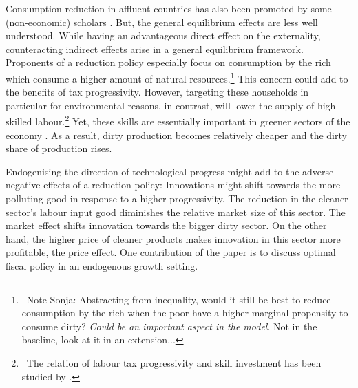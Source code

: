 
 Consumption reduction in affluent countries has also been promoted by some (non-economic) scholars \citep{Schor2005SustainableReduction, Pullinger2014WorkingDesign, Arrow2004AreMuch}. But, the general equilibrium effects are less well understood.
While having an advantageous direct effect on the externality, counteracting indirect effects arise in a general equilibrium framework. Proponents of a reduction policy especially focus on consumption by the rich which consume a higher amount of natural resources.\footnote{\ Note Sonja: Abstracting from inequality, would it still be best to reduce consumption by the rich when the poor have a higher marginal propensity to consume dirty? \textit{Could be an important aspect in the model}. Not in the baseline, look at it in an extension...}
This concern could add to the benefits of tax progressivity.
However, targeting these households in particular for environmental reasons, in contrast, will lower the supply of high skilled labour.\footnote{\ The relation of labour tax progressivity and skill investment has been studied by \cite{Heathcote2017OptimalFramework}.} Yet, these skills are essentially important in greener sectors of the economy \citep{Consoli2016DoCapital}. As a result, dirty production becomes relatively cheaper and the dirty share of production rises. 

Endogenising the direction of technological progress might add to the adverse negative effects of a reduction policy:
Innovations might shift towards the more polluting good in response to a higher progressivity. The reduction in the cleaner sector's labour input good diminishes the relative market size of this sector. The market effect shifts innovation towards the bigger dirty sector. On the other hand, the higher price of cleaner products makes innovation in this sector more profitable, the price effect. 
One contribution of the paper is to discuss optimal fiscal policy in an endogenous growth setting. 


